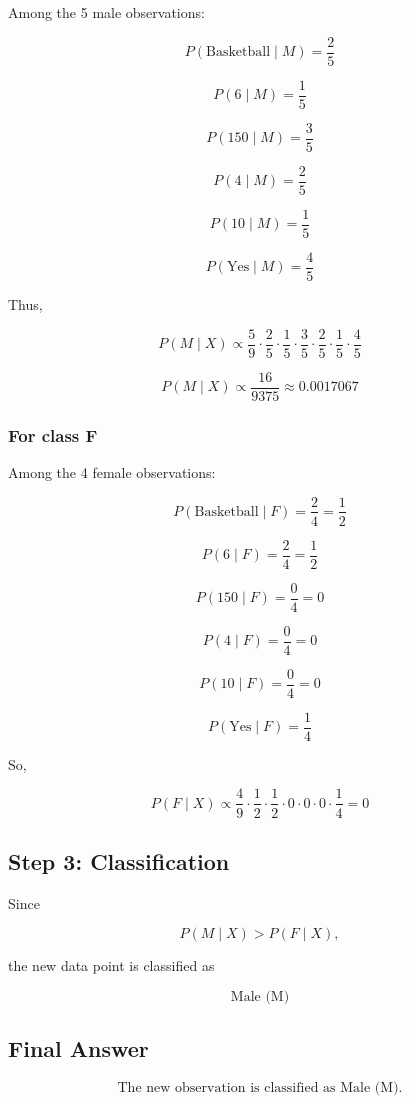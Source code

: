 \documentclass[11pt]{article}
\begin{document}
Among the 5 male observations:

\[
P(\text{Basketball}\mid M)=\frac{2}{5}
\]

\[
P(6\mid M)=\frac{1}{5}
\]

\[
P(150\mid M)=\frac{3}{5}
\]

\[
P(4\mid M)=\frac{2}{5}
\]

\[
P(10\mid M)=\frac{1}{5}
\]

\[
P(\text{Yes}\mid M)=\frac{4}{5}
\]

Thus,

\[
P(M\mid X)\propto
\frac{5}{9}\cdot
\frac{2}{5}\cdot
\frac{1}{5}\cdot
\frac{3}{5}\cdot
\frac{2}{5}\cdot
\frac{1}{5}\cdot
\frac{4}{5}
\]

\[
P(M\mid X)\propto \frac{16}{9375}\approx 0.0017067
\]

\subsubsection*{For class F}

Among the 4 female observations:

\[
P(\text{Basketball}\mid F)=\frac{2}{4}=\frac{1}{2}
\]

\[
P(6\mid F)=\frac{2}{4}=\frac{1}{2}
\]

\[
P(150\mid F)=\frac{0}{4}=0
\]

\[
P(4\mid F)=\frac{0}{4}=0
\]

\[
P(10\mid F)=\frac{0}{4}=0
\]

\[
P(\text{Yes}\mid F)=\frac{1}{4}
\]

So,

\[
P(F\mid X)\propto
\frac{4}{9}\cdot
\frac{1}{2}\cdot
\frac{1}{2}\cdot
0\cdot
0\cdot
0\cdot
\frac{1}{4}=0
\]

\subsection*{Step 3: Classification}

Since

\[
P(M\mid X) > P(F\mid X),
\]

the new data point is classified as

\[
\boxed{\text{Male (M)}}
\]

\subsection*{Final Answer}

\[
\boxed{\text{The new observation is classified as Male (M).}}
\]
\end{document}
